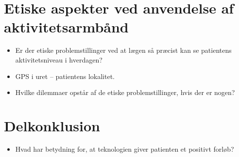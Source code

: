 \section{Etiske aspekter ved anvendelse af aktivitetsarmbånd}
\begin{itemize}
\item Er der etiske problemstillinger ved at lægen så præcist kan se patientens aktivitetsniveau i hverdagen?
\item GPS i uret – patientens lokalitet.
\item Hvilke dilemmaer opstår af de etiske problemstillinger, hvis der er nogen?
\end{itemize}

\section{Delkonklusion}
\begin{itemize}
\item Hvad har betydning for, at teknologien giver patienten et positivt forløb?
\end{itemize}

